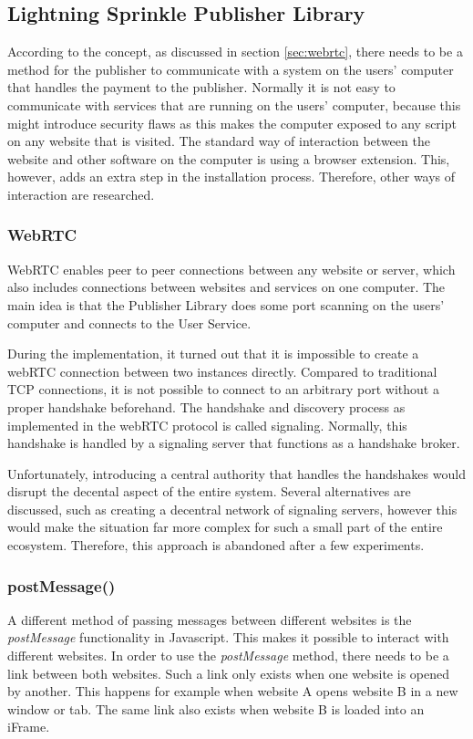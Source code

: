 \subsection{Lightning Sprinkle Publisher Library}
According to the concept, as discussed in section \ref{sec:webrtc}, there needs to be a method for the publisher to communicate with a system on the users' computer that handles the payment to the publisher. Normally it is not easy to communicate with services that are running on the users' computer, because this might introduce security flaws as this makes the computer exposed to any script on any website that is visited. The standard way of interaction between the website and other software on the computer is using a browser extension. This, however, adds an extra step in the installation process. Therefore, other ways of interaction are researched.

\subsubsection{WebRTC}

WebRTC enables peer to peer connections between any website or server, which also includes connections between websites and services on one computer. The main idea is that the Publisher Library does some port scanning on the users' computer and connects to the User Service.

During the implementation, it turned out that it is impossible to create a webRTC connection between two instances directly. Compared to traditional TCP connections, it is not possible to connect to an arbitrary port without a proper handshake beforehand. The handshake and discovery process as implemented in the webRTC protocol is called signaling. Normally, this handshake is handled by a signaling server that functions as a handshake broker.

Unfortunately, introducing a central authority that handles the handshakes would disrupt the decental aspect of the entire system. Several alternatives are discussed, such as creating a decentral network of signaling servers, however this would make the situation far more complex for such a small part of the entire ecosystem. Therefore, this approach is abandoned after a few experiments.

\subsubsection{postMessage()}
A different method of passing messages between different websites is the \textit{postMessage} functionality in Javascript. This makes it possible to interact with different websites. In order to use the \textit{postMessage} method, there needs to be a link between both websites. Such a link only exists when one website is opened by another. This happens for example when website A opens website B in a new window or tab. The same link also exists when website B is loaded into an iFrame. 

